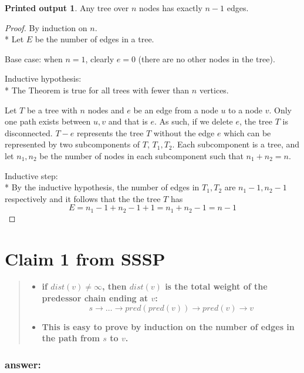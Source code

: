 \documentclass[titlepage]{article}\usepackage[]{graphicx}\usepackage[]{color}
\theoremstyle{definition}
\newtheorem{name}{Printed output}
\begin{document}
\newtheorem{mydef}{Theorem}

\begin{name}
  Any tree over $n$ nodes has exactly $n-1$ edges.
\end{name}


\begin{proof}
By induction on $n$. \\*
Let $E$ be the number of edges in a tree.

Base case: when $n =1$, clearly $e = 0$ (there are no other nodes in the tree).

Inductive hypothesis: \\*
The Theorem is true for all trees with fewer than $ n$ vertices.

Let $T$ be a tree with $n$ nodes and $e$ be an edge from a node $u$ to a node
$v$. Only one path exists between $u,v$ and that is $e$. As such, if we delete $e$, the
tree $T$ is disconnected. $T - e$ represents the tree $T$ without the edge $e$
which can be represented by two subcomponents of $T$, $T_1, T_2$. Each
subcomponent is a tree, and let $n_1,n_2$ be the number of nodes in each
subcomponent such that $n_1 + n_2 = n$. 

Inductive step: \\*
By the inductive hypothesis, the number of edges in $T_1, T_2$ are $n_1-1,
n_2-1$
respectively and it follows that the the tree $T$ has 
\[ E = n_1 -1 + n_2 -1 +1 = n_1 + n_2-1 = n-1 \]
  \qedhere
\end{proof}


\section{Claim 1 from SSSP}
\begin{quote}
\begin{itemize}
  \item \textbf{if $dist(v) \neq \infty $, then $dist(v)$ is the total weight
	of the predessor chain ending at $v$:
  \[ s \rightarrow \dots \rightarrow pred(pred(v)) \rightarrow pred(v) \rightarrow v \] }
  \item \textbf{This is easy to prove by induction on the number of edges in
	the path from $s$ to $v$.}
\end{itemize}
\end{quote}

\subsubsection{answer:}
\vspace{8cm}
\end{document}
